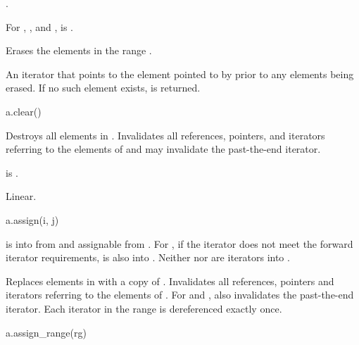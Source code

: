 \begin{itemdescr}
\pnum
\result
{}.

\pnum
\expects
For , , and ,
 is .

\pnum
\effects
Erases the elements in the range .

\pnum
\returns
An iterator that points to the element pointed to by 
prior to any elements being erased.
If no such element exists,  is returned.
\end{itemdescr}

%
\begin{itemdecl}
a.clear()
\end{itemdecl}

\begin{itemdescr}
\pnum
\result
{}

\pnum
\effects
Destroys all elements in .
Invalidates all references, pointers, and iterators
referring to the elements of  and
may invalidate the past-the-end iterator.

\pnum
\ensures
{} is .

\pnum
\complexity
Linear.
\end{itemdescr}

%
\begin{itemdecl}
a.assign(i, j)
\end{itemdecl}

\begin{itemdescr}
\pnum
\result
{}

\pnum
\expects
{} is  into  from 
and assignable from .
For ,
if the iterator does not meet
the forward iterator requirements,
 is also  into .
Neither  nor  are iterators into .

\pnum
\effects
Replaces elements in  with a copy of .
Invalidates all references, pointers and iterators
referring to the elements of .
For  and ,
also invalidates the past-the-end iterator.
Each iterator in the range  is dereferenced exactly once.
\end{itemdescr}

%
\begin{itemdecl}
a.assign_range(rg)
\end{itemdecl}

